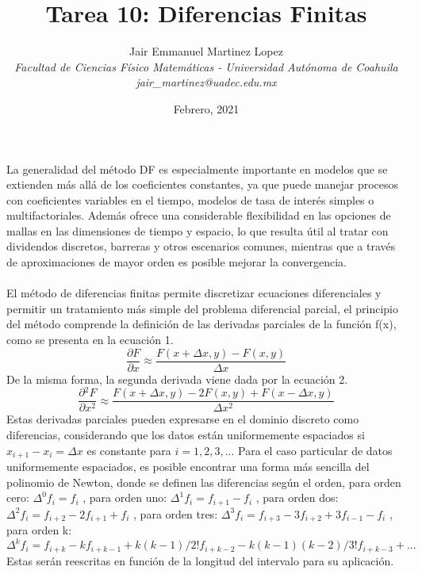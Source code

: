 \documentclass[12pt]{article}
\title{\vspace{-10mm}\fontsize{16pt}{10pt}\textbf{Tarea 10: Diferencias Finitas}} %
\author{
	\normalsize Jair Emmanuel Martinez Lopez\\ %
	\textit{\normalsize Facultad de Ciencias Físico Matemáticas - Universidad Autónoma de Coahuila}\\ %
	\textit{\normalsize jair\_{}martinez@uadec.edu.mx} %
}
\date{\normalsize Febrero, 2021} %
\begin{document}
\maketitle
\thispagestyle{fancy}
La generalidad del método DF es especialmente importante en modelos que se extienden más allá de los coeficientes constantes, ya que puede manejar procesos con coeficientes variables en el tiempo, modelos de tasa de interés simples o multifactoriales. Además ofrece una considerable flexibilidad en las opciones de mallas en las dimensiones de tiempo y espacio, lo que resulta útil al tratar con dividendos discretos, barreras y otros escenarios comunes, mientras que a través de aproximaciones de mayor orden es posible mejorar la convergencia.\\
\\
El método de diferencias finitas permite discretizar ecuaciones diferenciales y permitir un tratamiento más simple del problema diferencial parcial, el principio del método comprende la definición de las derivadas parciales de la función f(x), como se presenta en la ecuación 1.
\begin{equation}
	\dfrac{\partial{}F}{\partial{}x} \approx \frac{F(x+\Delta{}x,y)-F(x,y)}{\Delta{}x}
\end{equation}
De la misma forma, la segunda derivada viene dada por la ecuación 2.
\begin{equation}
	\dfrac{\partial{}^2F}{\partial{}x^2} \approx \frac{F(x+\Delta{}x,y)-2F(x,y)+F(x-\Delta{}x,y)}{\Delta{}x^2}
\end{equation}
Estas derivadas parciales pueden expresarse en el dominio discreto como diferencias, considerando que los datos están uniformemente espaciados si $x_{i+1} − x_{i} = \Delta{}x$ es constante para $i = 1, 2, 3,...$ Para el caso particular de datos uniformemente espaciados, es posible encontrar una forma más sencilla del polinomio de Newton, donde se definen las diferencias según el orden, para orden cero: $\Delta^{0} f_i = f_i$ , para orden uno: $\Delta^{1} f_i = f_{i+1} - f_i$ , para orden dos: $\Delta^{2} f_{i} = f_{i+2} - 2f_{i+1} + f_i$ , para orden tres: $\Delta^{3} f_i = f_{i+3} - 3 f_{i+2} + 3f_{i-1} - f_i$ , para orden k: $\Delta^{k} f_i = f_{i+k} - k f_{i+k-1} + k(k-1)/2! f_{i+k-2} - k(k-1)(k-2)/3! f_{i+k-3} + ...$ Estas serán reescritas en función de la longitud del intervalo para su aplicación.\\
\end{document}

